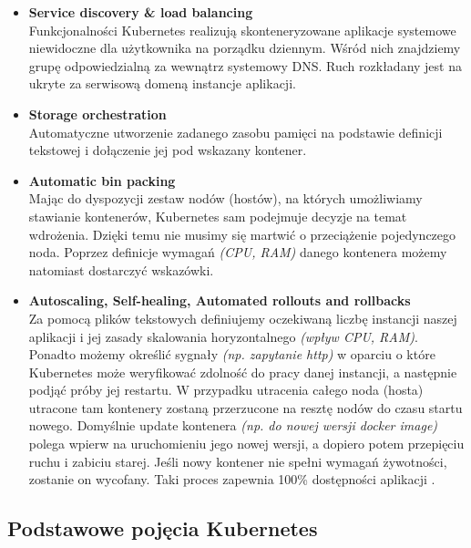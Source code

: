 \begin{itemize}
    \item
    \textbf{Service discovery \& load balancing}\\
    Funkcjonalności Kubernetes realizują skonteneryzowane aplikacje systemowe niewidoczne dla użytkownika na porządku dziennym.
    Wśród nich znajdziemy grupę odpowiedzialną za wewnątrz systemowy DNS. Ruch rozkładany jest na ukryte za serwisową domeną instancje aplikacji. 
    
    \item
    \textbf{Storage orchestration}\\
    Automatyczne utworzenie zadanego zasobu pamięci na podstawie definicji tekstowej i dołączenie jej pod wskazany kontener.

    \item
    \textbf{Automatic bin packing}\\
    Mając do dyspozycji zestaw nodów (hostów), na których umożliwiamy stawianie kontenerów, Kubernetes sam podejmuje decyzje na temat wdrożenia.
    Dzięki temu nie musimy się martwić o przeciążenie pojedynczego noda.
    Poprzez definicje wymagań \emph{(CPU, RAM)} danego kontenera możemy natomiast dostarczyć wskazówki. 

    \item
    \textbf{Autoscaling, Self-healing, Automated rollouts and rollbacks}\\
    Za pomocą plików tekstowych definiujemy oczekiwaną liczbę instancji naszej aplikacji i jej zasady skalowania horyzontalnego \emph{(wpływ CPU, RAM)}.
    Ponadto możemy określić sygnały \emph{(np. zapytanie http)} w oparciu o które Kubernetes może weryfikować zdolność do pracy danej instancji, a następnie podjąć próby jej restartu.
    W przypadku utracenia całego noda (hosta) utracone tam kontenery zostaną przerzucone na resztę nodów do czasu startu nowego.
    Domyślnie update kontenera \emph{(np. do nowej wersji docker image)} polega wpierw na uruchomieniu jego nowej wersji, a dopiero potem przepięciu ruchu i zabiciu starej.
    Jeśli nowy kontener nie spełni wymagań żywotności, zostanie on wycofany. Taki proces zapewnia 100\% dostępności aplikacji \cite{k8s-what}.
\end{itemize} 

\subsection{Podstawowe pojęcia Kubernetes}

